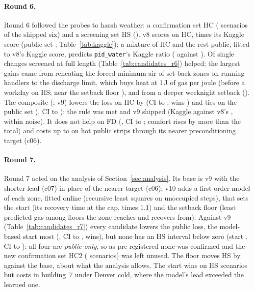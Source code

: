 \documentclass{article}
\begin{document}
\paragraph{Round 6.}
Round 6 followed the probes to harsh weather: a confirmation set HC (\RSixHarshCN{} scenarios
of the shipped six) and a screening set HS (\RSixHarshSN). v8 scores \RSixHarshCVEight{} on HC,
\RSixHarshCLevel{} times its Kaggle score (public set \RSixPubLevel; Table~\ref{tab:kaggle}); a mixture of
\RSixMixWPct{} HC and the rest public, fitted to v8's Kaggle score, predicts \texttt{pid\_water}'s Kaggle ratio
(\RSixMixPid{} against \RSixKagRatioPid). Of \RSixNSingles{} single changes screened at full length
(Table~\ref{tab:candidates_r6}) \RSixNHelps{} helped; the largest gains came from reheating the forced minimum air of
set-back zones on running handlers to the discharge limit, which buys heat at 1\,J of gas per joule (before a workday
\RSixScrCElevenHsRel{} on HS; near the setback floor \RSixScrCNineHsRel), and from a deeper weeknight setback
(\RSixScrCEightHsRel). The composite
(\RSixCompMembers; v9) lowers the loss on HC by \RSixConfHarshCRelAbs{} (CI \RSixConfHarshCRelHiAbs{} to
\RSixConfHarshCRelLoAbs; wins \RSixConfHarshCWins) and ties on the public set (\RSixConfPubRel, CI \RSixConfPubRelLo{} to
\RSixConfPubRelHi): the rule was met and v9 shipped (Kaggle \RSevKagVNine{} against v8's \RSixKagVEight, within noise).
It does not help on FD (\RSixConfFreshDefRel, CI \RSixConfFreshDefRelLo{} to \RSixConfFreshDefRelHi; comfort rises by
more than the total) and costs up to \RSixConfPubWorstRel{} on hot public strips through its nearer preconditioning
target (c06).

\paragraph{Round 7.}
Round 7 acted on the analysis of Section~\ref{sec:analysis}. Its base is v9 with the shorter lead (c07) in place of
the nearer target (c06); v10 adds a first-order model of each zone, fitted online (recursive least squares on unoccupied
steps), that sets the start (its recovery time at the cap, times 1.1) and the setback floor (least predicted gas
among floors the zone reaches and recovers from). Against v9 (Table~\ref{tab:candidates_r7}) every candidate lowers
the public loss, the model-based start most (\RSevScrMbrPubRel, CI \RSevScrMbrPubLo{} to \RSevScrMbrPubHi,
\RSevScrMbrPubWins{} wins), but none has an HS interval below zero (start \RSevScrMbrHsRel, CI \RSevScrMbrHsLo{} to
\RSevScrMbrHsHi): all four are \emph{public only}, so as pre-registered none was confirmed and the new confirmation
set HC2 (\RSevHCTwoN{} scenarios) was left unused. The floor moves HS by \RSevMbfVsBaseHsRel{} against the base,
about what the analysis allows. The start wins on \RSevMbrHsWins{} HS scenarios but costs
\RSevMbrHsWorstRel{} in building~7 under Denver cold, where the model's lead exceeded the learned one.
\end{document}
